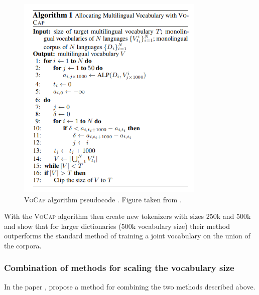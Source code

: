 \begin{figure}[ht]
    \centering
    \includegraphics[width=0.8\textwidth]{img/temp/vocap_algo.png}
    \caption{\textsc{VoCap} algorithm pseudocode \cite{zheng_allocating_2021}. Figure taken from \cite{zheng_allocating_2021}.}
    \label{alg:vocab_allocation}
\end{figure}

With the \textsc{VoCap} algorithm  then create new tokenizers with sizes 250k and 500k and show that for larger dictionaries (500k vocabulary size) their method outperforms the standard method of training a joint vocabulary on the union of the corpora. 


\subsubsection{Combination of methods for scaling the vocabulary size}

In the paper , \citeauthor{liang_xlm-v_2023} propose a method for combining the two methods described above. 

